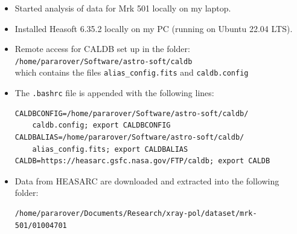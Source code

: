 	\begin{itemize}
		\item Started analysis of data for Mrk 501 locally on my laptop.

        \item Installed Heasoft 6.35.2 locally on my PC (running on Ubuntu 22.04 LTS).
        
        \item Remote access for CALDB set up in the folder:\\
        \verb|/home/pararover/Software/astro-soft/caldb|\\
        which contains the files \verb|alias_config.fits| and \verb|caldb.config|

        \item The \verb|.bashrc| file is appended with the following lines:
        \begin{verbatim}
CALDBCONFIG=/home/pararover/Software/astro-soft/caldb/
    caldb.config; export CALDBCONFIG
CALDBALIAS=/home/pararover/Software/astro-soft/caldb/
    alias_config.fits; export CALDBALIAS
CALDB=https://heasarc.gsfc.nasa.gov/FTP/caldb; export CALDB
        \end{verbatim}

        \item Data from HEASARC are downloaded and extracted into the following folder:
        \begin{verbatim}
/home/pararover/Documents/Research/xray-pol/dataset/mrk-501/01004701
        \end{verbatim}
	\end{itemize}
